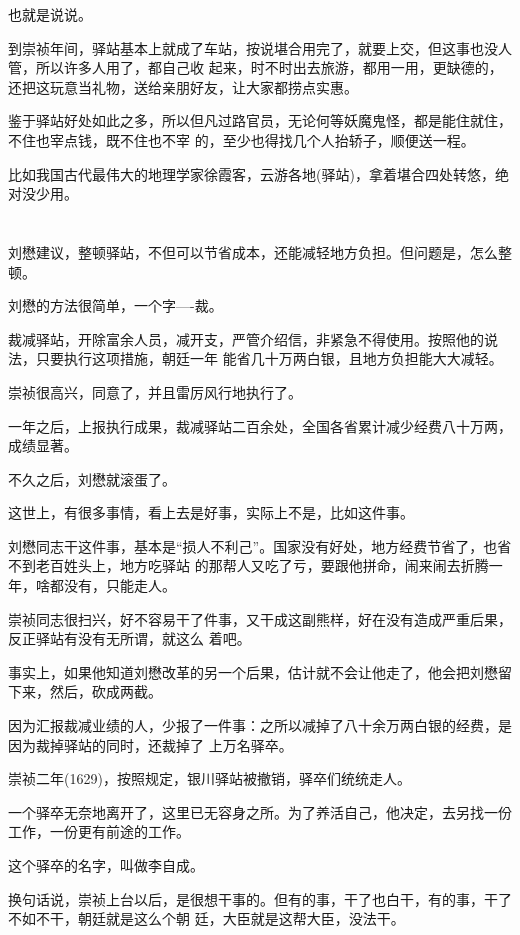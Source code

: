 \documentclass[11pt,a4paper,onecolumn]{article}
\begin{document}
也就是说说。

到崇祯年间，驿站基本上就成了车站，按说堪合用完了，就要上交，但这事也没人管，所以许多人用了，都自己收
起来，时不时出去旅游，都用一用，更缺德的，还把这玩意当礼物，送给亲朋好友，让大家都捞点实惠。

鉴于驿站好处如此之多，所以但凡过路官员，无论何等妖魔鬼怪，都是能住就住，不住也宰点钱，既不住也不宰
的，至少也得找几个人抬轿子，顺便送一程。

比如我国古代最伟大的地理学家徐霞客，云游各地(驿站)，拿着堪合四处转悠，绝对没少用。

\section[\thesection]{}

刘懋建议，整顿驿站，不但可以节省成本，还能减轻地方负担。但问题是，怎么整顿。

刘懋的方法很简单，一个字----裁。

裁减驿站，开除富余人员，减开支，严管介绍信，非紧急不得使用。按照他的说法，只要执行这项措施，朝廷一年
能省几十万两白银，且地方负担能大大减轻。

崇祯很高兴，同意了，并且雷厉风行地执行了。

一年之后，上报执行成果，裁减驿站二百余处，全国各省累计减少经费八十万两，成绩显著。

不久之后，刘懋就滚蛋了。

这世上，有很多事情，看上去是好事，实际上不是，比如这件事。

刘懋同志干这件事，基本是``损人不利己''。国家没有好处，地方经费节省了，也省不到老百姓头上，地方吃驿站
的那帮人又吃了亏，要跟他拼命，闹来闹去折腾一年，啥都没有，只能走人。

崇祯同志很扫兴，好不容易干了件事，又干成这副熊样，好在没有造成严重后果，反正驿站有没有无所谓，就这么
着吧。

事实上，如果他知道刘懋改革的另一个后果，估计就不会让他走了，他会把刘懋留下来，然后，砍成两截。

因为汇报裁减业绩的人，少报了一件事：之所以减掉了八十余万两白银的经费，是因为裁掉驿站的同时，还裁掉了
上万名驿卒。

崇祯二年(1629)，按照规定，银川驿站被撤销，驿卒们统统走人。

一个驿卒无奈地离开了，这里已无容身之所。为了养活自己，他决定，去另找一份工作，一份更有前途的工作。

这个驿卒的名字，叫做李自成。

换句话说，崇祯上台以后，是很想干事的。但有的事，干了也白干，有的事，干了不如不干，朝廷就是这么个朝
廷，大臣就是这帮大臣，没法干。
\end{document}
